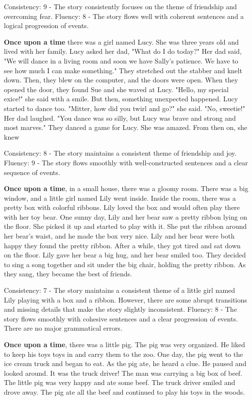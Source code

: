 \documentclass{article}
\begin{document}
Consistency: 9 - The story consistently focuses on the theme of friendship and overcoming fear.
Fluency: 8 - The story flows well with coherent sentences and a logical progression of events.

\textbf{Once upon a time} there was a girl named Lucy. She was three years old and lived with her family. Lucy asked her dad, "What do I do today?" Her dad said, "We will dance in a living room and soon we have Sally's patience. We have to see how much I can make something." They stretched out the stabber and knelt down. Then, they blew on the computer, and the doors were open. When they opened the door, they found Sue and she waved at Lucy. "Hello, my special exice!" she said with a smile. But then, something unexpected happened. Lucy started to dance too. "Mitter, how did you twirl and go?" she said. "No, sweetie!" Her dad laughed. "You dance was so silly, but Lucy was brave and strong and most marves." They danced a game for Lucy. She was amazed. From then on, she knew

Consistency: 8 - The story maintains a consistent theme of friendship and joy.
Fluency: 9 - The story flows smoothly with well-constructed sentences and a clear sequence of events.

\textbf{Once upon a time}, in a small house, there was a gloomy room. There was a big window, and a little girl named Lily went inside. Inside the room, there was a pretty box with colorful ribbons. Lily loved the box and would often play there with her toy bear. One sunny day, Lily and her bear saw a pretty ribbon lying on the floor. She picked it up and started to play with it. She put the ribbon around her bear's waist, and he made the box very nice. Lily and her bear were both happy they found the pretty ribbon. After a while, they got tired and sat down on the floor. Lily gave her bear a big hug, and her bear smiled too. They decided to sing a song together and sit under the big chair, holding the pretty ribbon. As they sang, they became the best of friends.

Consistency: 7 - The story maintains a consistent theme of a little girl named Lily playing with a box and a ribbon. However, there are some abrupt transitions and missing details that make the story slightly inconsistent.
Fluency: 8 - The story flows smoothly with cohesive sentences and a clear progression of events. There are no major grammatical errors.

\textbf{Once upon a time}, there was a little pig. The pig was very organized. He liked to keep his toys toys in and carry them to the zoo. One day, the pig went to the ice cream truck and began to eat. As the pig ate, he heard a clue. He paused and looked around. It was the truck driver! The man was carrying a big box of beef. The little pig was very happy and ate some beef. The truck driver smiled and drove away. The pig ate all the beef and continued to play his toys in the woods.
\end{document}
